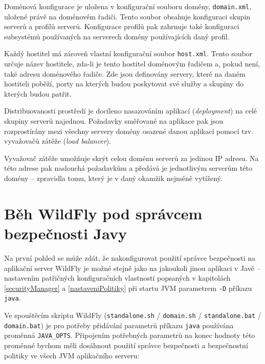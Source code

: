 Doménová konfigurace je uložena v konfigurační souboru domény, {\tt domain.xml}, uložené právě na doménovém řadiči.
Tento soubor obsahuje konfiguraci skupin serverů a profilů serverů.
Konfigurace profilů pak zahrnuje také konfiguraci subsystémů používaných na serverech domény používajících daný profil.
\cite{jbossDomainSetup}

Každý hostitel má zároveň vlastní konfigurační soubor {\tt host.xml}.
Tento soubor určuje název hostitele, zda-li je tento hostitel doménovým řadičem a, pokud není, také adresu doménového řadiče.
Zde jsou definovány servery, které na daném hostiteli poběží, porty na kterých budou poskytovat své služby a skupiny do kterých budou patřit.
\cite{jbossDomainSetup}

Distribuovanosti prostředí je docíleno nasazováním aplikací ({\it deployment}) na celé skupiny serverů najednou.
Požadavky směřované na aplikace pak jsou rozprostírány mezi všechny servery domény osazené danou aplikací pomocí tzv. vyvažovačů zátěže ({\it load balancer}).
\cite{jbossLoadBalancing}

Vyvažovač zátěže umožňuje skrýt celou doménu serverů za jedinou IP adresu.
Na této adrese pak naslouchá požadavkům a předává je jednotlivým serverům této domény -- zpravidla tomu, který je v daný okamžik nejméně vytížený.
\cite{jbossLoadBalancing}

\section{Běh WildFly pod správcem bezpečnosti Javy}

Na první pohled se může zdát, že nakonfigurovat použití správce bezpečnosti na aplikační server WildFly je možné stejně jako na jakoukoli jinou aplikaci v Javě -- nastavením patřičných konfiguračních vlastností popsaných v kapitolách \ref{securityManager} a \ref{nastaveniPolitiky} při startu JVM parametrem {\tt -D} příkazu {\tt java}.

Ve spouštěcím skriptu WildFly ({\tt standalone.sh} / {\tt domain.sh} / {\tt standalone.bat} / {\tt domain.bat}) je pro potřeby přidávání parametrů příkazu {\tt java} používána proměnná {\tt JAVA\_OPTS}. Připojením potřebných parametrů na konec hodnoty této proměnné bychom měli dosáhnout použití správce bezpečnosti a bezpečnostní politiky ve všech JVM aplikačního serveru: \cite{jbossSecurityManager}

